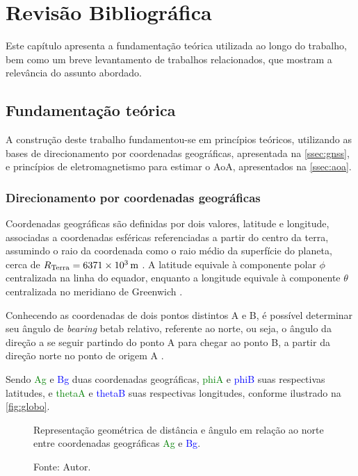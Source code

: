 \chapter{Revisão Bibliográfica}\label{cap:revbib}

Este capítulo apresenta a fundamentação teórica utilizada ao longo do trabalho, bem como um breve levantamento de trabalhos relacionados, que mostram a relevância do assunto abordado.

\section{Fundamentação teórica}

A construção deste trabalho fundamentou-se em princípios teóricos, utilizando as bases de direcionamento por coordenadas geográficas, apresentada na \autoref{ssec:gnss}, e princípios de eletromagnetismo para estimar o \ac{AoA}, apresentados na \autoref{ssec:aoa}.

\subsection{Direcionamento por coordenadas geográficas}\label{ssec:gnss}

Coordenadas geográficas são definidas por dois valores, latitude e longitude, associadas a coordenadas esféricas referenciadas a partir do centro da terra, assumindo o raio da coordenada como o raio médio da superfície do planeta, cerca de $R_\text{Terra} = \SI{6371E3}{\metre}$ \cite{palomaguitarrara, chrisveness}.
A latitude equivale à componente polar $\phi$ centralizada na linha do equador, enquanto a longitude equivale à componente $\theta$ centralizada no meridiano de Greenwich \cite{palomaguitarrara, henriquefleming2003}.

Conhecendo as coordenadas de dois pontos distintos A e B, é possível determinar seu ângulo de \textit{bearing} \ac{betab} relativo, referente ao norte, ou seja, o ângulo da direção a se seguir partindo do ponto A para chegar ao ponto B, a partir da direção norte no ponto de origem A \cite{henriquefleming2003}.

Sendo \textcolor{Green}{\ac{Ag}} e \textcolor{Blue}{\ac{Bg}} duas coordenadas geográficas, \textcolor{Green}{\ac{phiA}} e \textcolor{Blue}{\ac{phiB}} suas respectivas latitudes, e \textcolor{Green}{\ac{thetaA}} e \textcolor{Blue}{\ac{thetaB}} suas respectivas longitudes, conforme ilustrado na \autoref{fig:globo}.

\begin{figure}[htbp]
    \centering
    \caption{Representação geométrica de distância e ângulo em relação ao norte entre coordenadas geográficas \textcolor{Green}{\ac{Ag}} e \textcolor{Blue}{\ac{Bg}}.}
    
    \caption*{Fonte: Autor.}
    \label{fig:globo}
\end{figure}

